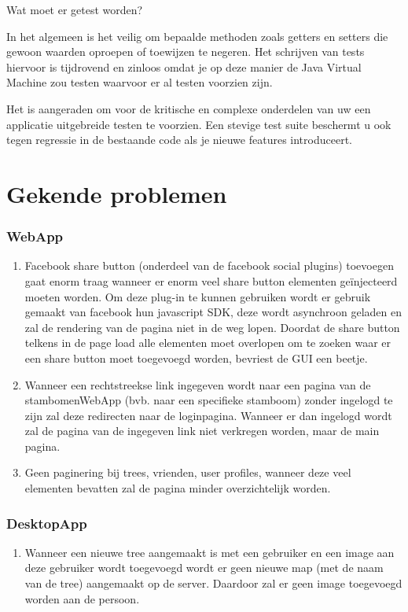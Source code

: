 \documentclass[pdftex,a4paper,12pt,twoside]{report}
\begin{document}
Wat moet er getest worden?

In het algemeen is het veilig om bepaalde methoden zoals getters en setters die gewoon waarden oproepen of toewijzen te negeren. Het schrijven van tests hiervoor is tijdrovend en zinloos omdat je op deze manier de Java Virtual Machine zou testen waarvoor er al testen voorzien zijn.

Het is aangeraden om voor de kritische en complexe onderdelen van uw een applicatie uitgebreide testen te voorzien. Een stevige test suite beschermt u ook tegen regressie in de bestaande code als je nieuwe features introduceert.




\chapter{Gekende problemen}
\subsection{WebApp}
\begin{enumerate}
\item \label{it:first}Facebook share button (onderdeel van de facebook social plugins) toevoegen gaat enorm traag wanneer er enorm veel share button elementen geïnjecteerd moeten worden.
Om deze plug-in te kunnen gebruiken wordt er gebruik gemaakt van facebook hun javascript SDK, deze wordt asynchroon geladen en zal de rendering van de pagina niet in de weg lopen.
Doordat de share button telkens in de page load alle elementen moet overlopen om te zoeken waar er een share button moet toegevoegd worden, bevriest de GUI een beetje.

\item \label{it:first}Wanneer een rechtstreekse link ingegeven wordt naar een pagina van de stambomenWebApp (bvb. naar een specifieke stamboom) zonder ingelogd te zijn zal deze redirecten naar de loginpagina. Wanneer er dan ingelogd wordt zal de pagina van de ingegeven link niet verkregen worden, maar de main pagina.

\item \label{it:first}Geen paginering bij trees, vrienden, user profiles, wanneer deze veel elementen bevatten zal de pagina minder overzichtelijk worden.
\end{enumerate}

\subsection{DesktopApp}
\begin{enumerate}
\item \label{it:first}Wanneer een nieuwe tree aangemaakt is met een gebruiker en een image aan deze gebruiker wordt toegevoegd wordt er geen nieuwe map (met de naam van de tree) aangemaakt op de server. Daardoor zal er geen image toegevoegd worden aan de persoon.
\end{enumerate}
\end{document}

